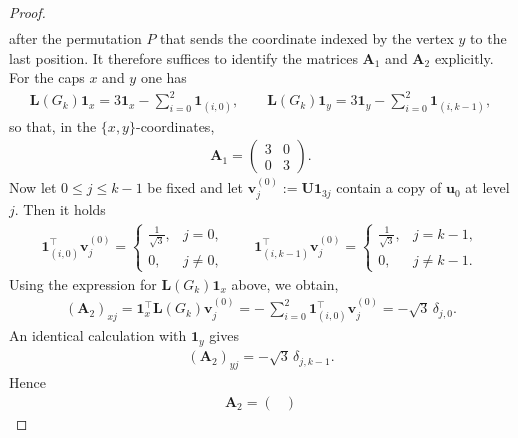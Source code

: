 \documentclass[11pt,a4paper]{amsart}
\begin{document}
\begin{proof}
\begin{align*}
        \end{align*}
    after the permutation $P$ that sends the coordinate indexed by the vertex $y$ to the last position. It therefore suffices to identify the matrices $\mathbf{A}_1$ and $\mathbf{A}_2$ explicitly. For the caps $x$ and $y$ one has
        \begin{align*}
            \mathbf{L}(G_k)\mathbf{1}_x=3\mathbf{1}_x-\sum_{i=0}^2\mathbf{1}_{(i,0)},
            \qquad
            \mathbf{L}(G_k)\mathbf{1}_y=3\mathbf{1}_y-\sum_{i=0}^2\mathbf{1}_{(i,k-1)},
        \end{align*}
    so that, in the $\{x,y\}$-coordinates,
        \begin{align*}
            \mathbf{A}_1=\begin{pmatrix}3&0\\[2pt]0&3\end{pmatrix}.
        \end{align*}
    Now let $0\le j\le k-1$ be fixed and let $\mathbf{v}^{(0)}_j:=\mathbf{U}\mathbf{1}_{3j}$ contain a copy of $\mathbf{u}_0$ at level $j$. Then it holds
        \begin{align*} 
            \mathbf{1}_{(i,0)}^{\top}\mathbf{v}^{(0)}_j=
            \begin{cases}
            \frac1{\sqrt3},&j=0,\\
            0,&j\ne 0,
            \end{cases}
            \qquad
            \mathbf{1}_{(i,k-1)}^{\top}\mathbf{v}^{(0)}_j=
            \begin{cases}
            \frac1{\sqrt3},&j=k-1,\\
            0,&j\ne k-1.
            \end{cases}
        \end{align*}
    Using the expression for $\mathbf{L}(G_k)\mathbf{1}_x$ above, we obtain, 
        \begin{align*}
            (\mathbf{A}_2)_{xj}=\mathbf{1}_x^{\top}\mathbf{L}(G_k)\mathbf{v}^{(0)}_j
            =-\,\sum_{i=0}^2\mathbf{1}_{(i,0)}^{\top}\mathbf{v}^{(0)}_j
            =-\sqrt3\,\delta_{j,0}.
        \end{align*}
    An identical calculation with $\mathbf{1}_y$ gives
        \begin{align*}
            (\mathbf{A}_2)_{yj}=-\sqrt3\,\delta_{j,k-1}.
        \end{align*}
    Hence
        \begin{align*}
            \mathbf{A}_2=\begin{pmatrix}

\end{pmatrix}
\end{align*}
\end{proof}
\end{document}
